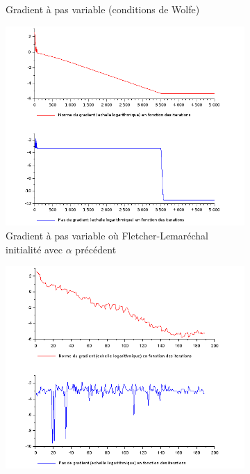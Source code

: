 \documentclass{article}
\begin{document}
\begin{figure}
\begin{subfigure}[t]{.4\textwidth}
            \caption{Gradient à pas variable (conditions de Wolfe)}
            \label{fig:pas_variable}
        \end{subfigure}
        \hfill
        \begin{subfigure}[t]{.4\textwidth}
            \includegraphics[width=\textwidth]{../Images/pas_variable_initAlpha.png}
            \caption{Gradient à pas variable où Fletcher-Lemaréchal initialité avec $\alpha$ précédent}
            \label{fig:pas_variableAlpha}
        \end{subfigure}
        \hfill
        \begin{subfigure}[t]{.4\textwidth}
            \includegraphics[width=\textwidth]{../Images/Polak_Ribiere.png}

\end{subfigure}
\end{figure}
\end{document}
